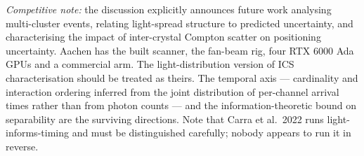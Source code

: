 \emph{Competitive note:} the discussion explicitly announces future work analysing
multi-cluster events, relating light-spread structure to predicted uncertainty, and
characterising the impact of inter-crystal Compton scatter on positioning uncertainty.
Aachen has the built scanner, the fan-beam rig, four RTX 6000 Ada GPUs and a commercial
arm. The light-distribution version of ICS characterisation should be treated as theirs.
The temporal axis --- cardinality and interaction ordering inferred from the joint
distribution of per-channel arrival times rather than from photon counts --- and the
information-theoretic bound on separability are the surviving directions. Note that
Carra et al.\ 2022 runs light-informs-timing and must be distinguished carefully; nobody
appears to run it in reverse.